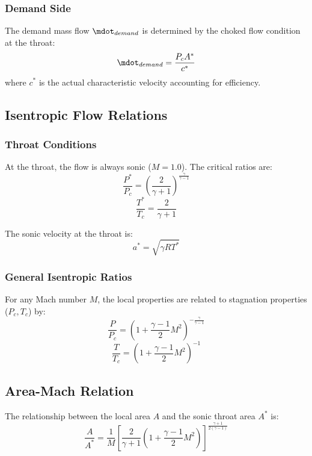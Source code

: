 \subsubsection{Demand Side}
The demand mass flow \(\mdot_{demand}\) is determined by the choked flow condition at the throat:
\begin{equation}
\mdot_{demand} = \frac{P_c A^*}{c^*}
\end{equation}
where \(c^*\) is the actual characteristic velocity accounting for efficiency.

\subsection{Isentropic Flow Relations}

\subsubsection{Throat Conditions}
At the throat, the flow is always sonic (\(M=1.0\)). The critical ratios are:
\begin{equation}
\frac{P^*}{P_c} = \left( \frac{2}{\gamma+1} \right)^{\frac{\gamma}{\gamma-1}}
\end{equation}
\begin{equation}
\frac{T^*}{T_c} = \frac{2}{\gamma+1}
\end{equation}

The sonic velocity at the throat is:
\begin{equation}
a^* = \sqrt{\gamma R T^*}
\end{equation}

\subsubsection{General Isentropic Ratios}
For any Mach number \(M\), the local properties are related to stagnation properties (\(P_c, T_c\)) by:
\begin{equation}
\frac{P}{P_c} = \left( 1 + \frac{\gamma-1}{2} M^2 \right)^{-\frac{\gamma}{\gamma-1}}
\end{equation}
\begin{equation}
\frac{T}{T_c} = \left( 1 + \frac{\gamma-1}{2} M^2 \right)^{-1}
\end{equation}

\subsection{Area-Mach Relation}
The relationship between the local area \(A\) and the sonic throat area \(A^*\) is:
\begin{equation}
\frac{A}{A^*} = \frac{1}{M} \left[ \frac{2}{\gamma+1} \left( 1 + \frac{\gamma-1}{2} M^2 \right) \right]^{\frac{\gamma+1}{2(\gamma-1)}}
\end{equation}

